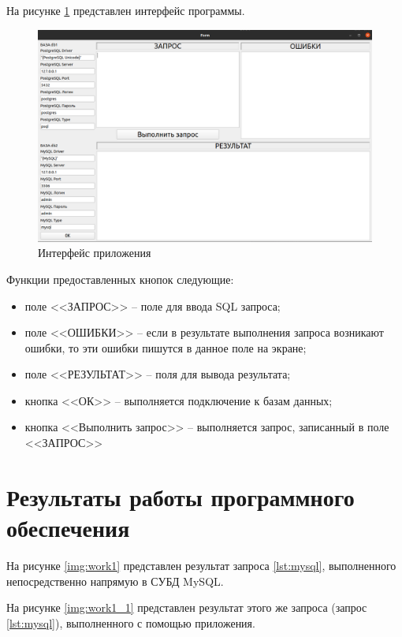На рисунке \ref{img:interf} представлен интерфейс программы.

\begin{figure}[h!]
	\begin{center}
		\includegraphics[scale=0.5]{./inc/img/interf}
		\caption{Интерфейс приложения}
		\label{img:interf}
	\end{center}
\end{figure}

Функции предоставленных кнопок следующие:
\begin{itemize}
	\item поле <<ЗАПРОС>> -- поле для ввода SQL запроса;
	\item поле <<ОШИБКИ>> -- если в результате выполнения запроса возникают ошибки, то эти ошибки пишутся в данное поле на экране;
	\item поле <<РЕЗУЛЬТАТ>> -- поля для вывода результата;
	\item кнопка <<ОК>> -- выполняется подключение к базам данных;
	\item кнопка <<Выполнить запрос>> -- выполняется запрос, записанный в поле <<ЗАПРОС>>
\end{itemize}


\section{Результаты работы программного обеспечения}

На рисунке \ref{img:work1} представлен результат запроса \ref{lst:mysql}, выполненного непос\-редственно напрямую в СУБД MySQL.

На рисунке \ref{img:work1_1} представлен результат этого же запроса (запрос \ref{lst:mysql}), выполненного с помощью приложения.

